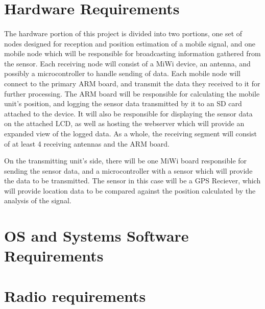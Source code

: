 \documentclass{article}
\begin{document}
\section*{Hardware Requirements}
\paragraph*{}
The hardware portion of this project is divided into two portions, one set of nodes designed for reception and position estimation of a mobile signal, and one mobile node which will be responsible for broadcasting information gathered from the sensor. Each receiving node will consist of a MiWi device, an antenna, and possibly a microcontroller to handle sending of data. Each mobile node will connect to the primary ARM board, and transmit the data they received to it for further processing. The ARM board will be responsible for calculating the mobile unit's position, and logging the sensor data transmitted by it to an SD card attached to the device. It will also be responsible for displaying the sensor data on the attached LCD, as well as hosting the webserver which will provide an expanded view of the logged data. As a whole, the receiving segment will consist of at least 4 receiving antennas and the ARM board.

On the transmitting unit's side, there will be one MiWi board responsible for sending the sensor data, and a microcontroller with a sensor which will provide the data to be transmitted. The sensor in this case will be a GPS Reciever, which will provide location data to be compared against the position calculated by the analysis of the signal.

\section*{OS and Systems Software Requirements}

\section*{Radio requirements}
\end{document}
